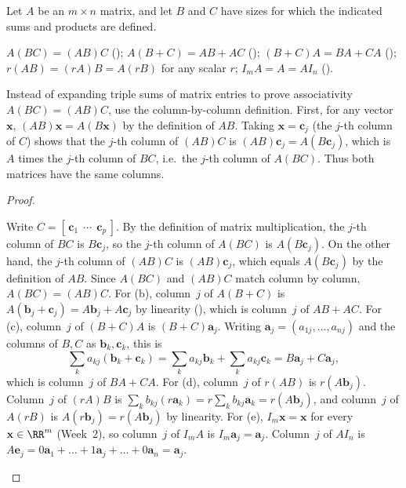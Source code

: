 \documentclass[10pt]{scrartcl}
\newcommand{\vv}[1]{\mathbf{#1}}
\begin{document}
\begin{theorem*}
  Let $A$ be an $m\times n$ matrix, and let $B$ and $C$ have sizes for which the indicated sums and products are defined.
  \begin{enumerate}[(a)]
    \ii $A(BC) = (AB)C$ \quad ();
    \ii $A(B+C) = AB + AC$ \quad ();
    \ii $(B+C)A = BA + CA$ \quad ();
    \ii $r(AB) = (rA)B = A(rB)$ for any scalar $r$;
    \ii $I_m A = A = A I_n$ \quad ().
  \end{enumerate}
\end{theorem*}
\begin{ideabox}
  Instead of expanding triple sums of matrix entries to prove associativity $A(BC)=(AB)C$, use the column-by-column definition. First, for any vector $\vv x$, $(AB)\vv x=A(B\vv x)$ by the definition of $AB$. Taking $\vv x=\vv c_j$ (the $j$-th column of $C$) shows that the $j$-th column of $(AB)C$ is $(AB)\vv c_j=A(B\vv c_j)$, which is $A$ times the $j$-th column of $BC$, i.e.\ the $j$-th column of $A(BC)$. Thus both matrices have the same columns.
\end{ideabox}
\begin{proof}
  \begin{steps}
    \ii Write $C=[\,\vv c_1\ \ \cdots\ \ \vv c_p\,]$. By the definition of matrix multiplication, the $j$-th column of $BC$ is $B\vv c_j$, so the $j$-th column of $A(BC)$ is $A(B\vv c_j)$. On the other hand, the $j$-th column of $(AB)C$ is $(AB)\vv c_j$, which equals $A(B\vv c_j)$ by the definition of $AB$. Since $A(BC)$ and $(AB)C$ match column by column, $A(BC)=(AB)C$.
    \ii For (b), column~$j$ of $A(B+C)$ is $A(\vv b_j+\vv c_j)=A\vv b_j+A\vv c_j$ by linearity (), which is column~$j$ of $AB+AC$.
    \ii For (c), column~$j$ of $(B+C)A$ is $(B+C)\vv a_j$. Writing $\vv a_j=(a_{1j},\dots,a_{nj})$ and the columns of $B,C$ as $\vv b_k,\vv c_k$, this is
    \[
      \textstyle\sum_k a_{kj}(\vv b_k+\vv c_k)=\sum_k a_{kj}\vv b_k+\sum_k a_{kj}\vv c_k=B\vv a_j+C\vv a_j,
    \]
    which is column~$j$ of $BA+CA$.
    \ii For (d), column~$j$ of $r(AB)$ is $r(A\vv b_j)$. Column~$j$ of $(rA)B$ is $\sum_k b_{kj}(r\vv a_k)=r\sum_k b_{kj}\vv a_k=r(A\vv b_j)$, and column~$j$ of $A(rB)$ is $A(r\vv b_j)=r(A\vv b_j)$ by linearity.
    \ii For (e), $I_m\vv x=\vv x$ for every $\vv x\in\RR^m$ (Week~2), so column~$j$ of $I_mA$ is $I_m\vv a_j=\vv a_j$. Column~$j$ of $AI_n$ is $A\vv e_j=0\vv a_1+\dots+1\vv a_j+\dots+0\vv a_n=\vv a_j$.
  \end{steps}
\end{proof}
\end{document}
